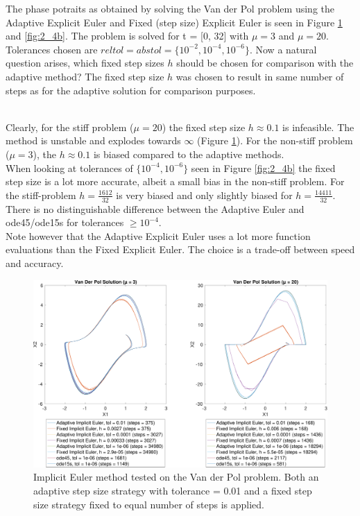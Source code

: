 The phase potraits as obtained by solving the Van der Pol problem using the Adaptive Explicit Euler and Fixed (step size) Explicit Euler is seen in Figure \ref{fig:2_4a} and \ref{fig:2_4b}. The problem is solved for t = [0, 32] with $\mu = 3$ and $\mu =20$. Tolerances chosen are $reltol = abstol = \{10^{-2}, 10^{-4}, 10^{-6}\}$. Now a natural question arises, which fixed step sizes $h$ should be chosen for comparison with the adaptive method? The fixed step size $h$ was chosen to result in same number of steps as for the adaptive solution for comparison purposes.

\\
Clearly, for the stiff problem ($\mu = 20$) the fixed step size $h \approx 0.1$ is infeasible. The method is unstable and explodes towards $\infty$ (Figure \ref{fig:2_4a}). For the non-stiff problem ($\mu = 3$), the $h \approx 0.1$ is biased compared to the adaptive methods.
\\

When looking at tolerances of $\{10^{-4}, 10^{-6}\}$ seen in Figure \ref{fig:2_4b} the fixed step size is a lot more accurate, albeit a small bias in the non-stiff problem. For the stiff-problem $h=\frac{1612}{32}$ is very biased and only slightly biased for $h=\frac{14411}{32}$. There is no distinguishable difference between the Adaptive Euler and ode45/ode15s for tolerances $\geq 10^{-4}$.
\\

Note however that the Adaptive Explicit Euler uses a lot more function evaluations than the Fixed Explicit Euler. The choice is a trade-off between speed and accuracy.

\begin{figure}
    \centering
    \includegraphics[width=\textwidth]{plots/3_4main.pdf}
    \caption{Implicit Euler method tested on the Van der Pol problem. Both an adaptive step size strategy with tolerance = 0.01 and a fixed step size strategy fixed to equal number of steps is applied.}
    \label{fig:2_4a}
\end{figure}

